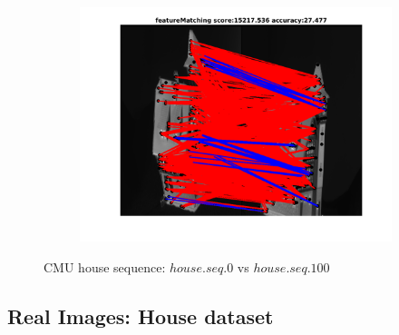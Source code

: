 \documentclass[
	fontsize=12pt,
	paper=a4,
	twoside=false,
	numbers=noenddot,
	plainheadsepline,
	toc=listof,
	toc=bibliography
]{scrartcl}
\begin{document}
\begin{figure}[h]
\begin{subfigure}[b]{0.3\textwidth}
		\includegraphics[scale=0.25]{"fig_ver2608/RealImages/HouseSeq/no_descr/using_cpd_afftrafo/ext_solution/fi_11_featureMatching"}  
	\end{subfigure} 
	
	\caption{CMU house sequence: $house.seq.0$ vs $house.seq.100$}
\end{figure}
\FloatBarrier

\newpage
\subsection{Real Images: House dataset}
\end{document}
